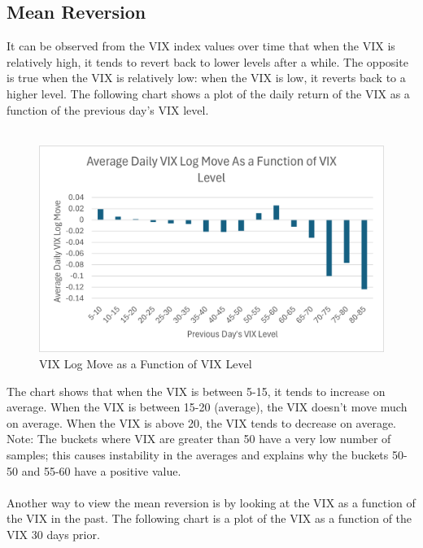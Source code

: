 \documentclass[11pt, oneside]{book}
\begin{document}
\subsection{Mean Reversion} \label{SigOfVIX-VIXBehave-MeanRev}
It can be observed from the VIX index values over time that when the VIX is relatively high, it tends to revert back to lower levels after a while. The opposite is true when the VIX is relatively low: when the VIX is low, it reverts back to a higher level. The following chart shows a plot of the daily return of the VIX as a function of the previous day's VIX level.
\\
\\
\begin{figure}[H]
\centering
\includegraphics[width=\textwidth]{VIXDailyLogMoveAsAFunctionOfVIX.png}
\caption{VIX Log Move as a Function of VIX Level} \label{Fig-VIXLogFunctionOfVIX}
\end{figure}
\noindent
The chart shows that when the VIX is between 5-15, it tends to increase on average. When the VIX is between 15-20 (average), the VIX doesn't move much on average. When the VIX is above 20, the VIX tends to decrease on average. Note: The buckets where VIX are greater than 50 have a very low number of samples; this causes instability in the averages and explains why the buckets 50-50 and 55-60 have a positive value. \\
\\
Another way to view the mean reversion is by looking at the VIX as a function of the VIX in the past. The following chart is a plot of the VIX as a function of the VIX 30 days prior.
\\
\\
\end{document}
